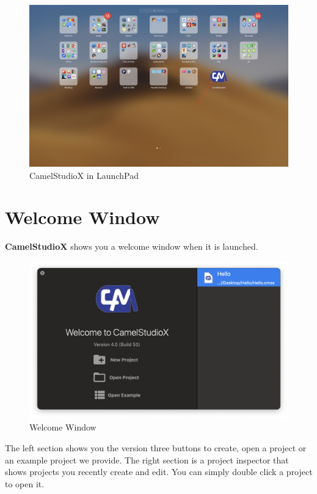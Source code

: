 \documentclass{article}
\begin{document}
		\begin{figure}[h]
			\centering
			
		\end{figure}
		
		\begin{figure}[h]
			\centering
			\includegraphics[width=.8\textwidth]{InLaunchPad.png}
			\caption{CamelStudioX in LaunchPad}
		\end{figure}
	
	\newpage
	\section{Welcome Window}
	
	\textbf{CamelStudioX} shows you a welcome window when it is launched.
		
	\begin{figure}[!h]
		\centering
		\includegraphics[width=.8\textwidth]{CamelStudioX-Welcome}
		\caption{Welcome Window}
	\end{figure}
		
	The left section shows you the version three buttons to create, open a project or an example project we provide.
	The right section is a project inspector that shows projects you recently create and edit. You can simply double click a project  to open it.
		
\end{document}
